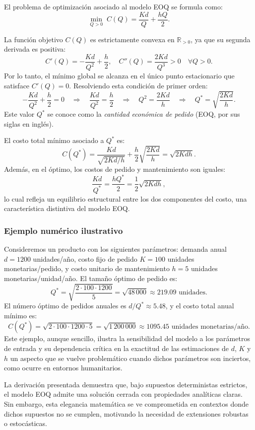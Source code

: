 \documentclass[
  spanish,
  us-letterpaper,
]{scrreprt}
\numberwithin{equation}{section}
\begin{document}
El problema de optimización asociado al modelo EOQ se formula como: \[
\min_{Q > 0} \; C(Q) = \frac{K d}{Q} + \frac{h Q}{2}.
\]

La función objetivo \(C(Q)\) es estrictamente convexa en
\(\mathbb{R}_{>0}\), ya que su segunda derivada es positiva: \[
C'(Q) = -\frac{K d}{Q^2} + \frac{h}{2}, \quad
C''(Q) = \frac{2 K d}{Q^3} > 0 \quad \forall Q > 0.
\] Por lo tanto, el mínimo global se alcanza en el único punto
estacionario que satisface \(C'(Q) = 0\). Resolviendo esta condición de
primer orden: \[
-\frac{K d}{Q^2} + \frac{h}{2} = 0
\quad \Longrightarrow \quad
\frac{K d}{Q^2} = \frac{h}{2}
\quad \Longrightarrow \quad
Q^2 = \frac{2 K d}{h}
\quad \Longrightarrow \quad
Q^* = \sqrt{\frac{2 K d}{h}}.
\] Este valor \(Q^*\) se conoce como la \emph{cantidad económica de
pedido} (EOQ, por sus siglas en inglés).

El costo total mínimo asociado a \(Q^*\) es: \[
C(Q^*) = \frac{K d}{\sqrt{2 K d / h}} + \frac{h}{2} \sqrt{\frac{2 K d}{h}}
= \sqrt{2 K d h}.
\] Además, en el óptimo, los costos de pedido y mantenimiento son
iguales: \[
\frac{K d}{Q^*} = \frac{h Q^*}{2} = \frac{1}{2} \sqrt{2 K d h},
\] lo cual refleja un equilibrio estructural entre los dos componentes
del costo, una característica distintiva del modelo EOQ.

\subsubsection{Ejemplo numérico
ilustrativo}\label{ejemplo-numuxe9rico-ilustrativo}

Consideremos un producto con los siguientes parámetros: demanda anual
\(d = 1200\) unidades/año, costo fijo de pedido \(K = 100\) unidades
monetarias/pedido, y costo unitario de mantenimiento \(h = 5\) unidades
monetarias/unidad/año. El tamaño óptimo de pedido es: \[
Q^* = \sqrt{\frac{2 \cdot 100 \cdot 1200}{5}} = \sqrt{48\,000} \approx 219.09 \text{ unidades}.
\] El número óptimo de pedidos anuales es \(d / Q^* \approx 5.48\), y el
costo total anual mínimo es: \[
C(Q^*) = \sqrt{2 \cdot 100 \cdot 1200 \cdot 5} = \sqrt{1\,200\,000} \approx 1095.45 \text{ unidades monetarias/año}.
\] Este ejemplo, aunque sencillo, ilustra la sensibilidad del modelo a
los parámetros de entrada y su dependencia crítica en la exactitud de
las estimaciones de \(d\), \(K\) y \(h\) un aspecto que se vuelve
problemático cuando dichos parámetros son inciertos, como ocurre en
entornos humanitarios.

La derivación presentada demuestra que, bajo supuestos deterministas
estrictos, el modelo EOQ admite una solución cerrada con propiedades
analíticas claras. Sin embargo, esta elegancia matemática se ve
comprometida en contextos donde dichos supuestos no se cumplen,
motivando la necesidad de extensiones robustas o estocásticas.
\end{document}

